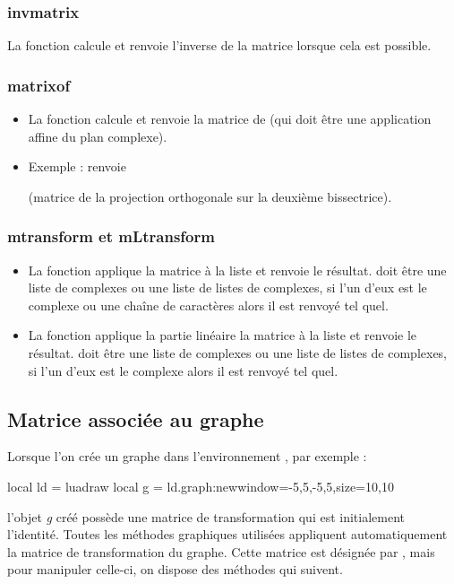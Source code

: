 \subsubsection{invmatrix}
La fonction  calcule et renvoie l'inverse de la matrice  lorsque cela est possible.

\subsubsection{matrixof}
\begin{itemize}
    \item La fonction  calcule et renvoie la matrice de  (qui doit être une application affine du plan complexe).
    \item Exemple :  renvoie \par
      (matrice de la projection orthogonale sur la deuxième bissectrice).
\end{itemize}

\subsubsection{mtransform et mLtransform}
\begin{itemize}
    \item La fonction  applique la matrice  à la liste  et renvoie le résultat.  doit être une liste de complexes ou une liste de listes de complexes, si l'un d'eux est le complexe  ou une chaîne de caractères alors il est renvoyé tel quel.
    
    \item La fonction  applique la partie linéaire la matrice  à la liste  et renvoie le résultat.  doit être une liste de complexes ou une liste de listes de complexes, si l'un d'eux est le complexe  alors il est renvoyé tel quel.
\end{itemize}

\subsection{Matrice associée au graphe}

Lorsque l'on crée un graphe dans l'environnement \luadrawenv, par exemple :
\begin{Luacode}
local ld = luadraw
local g = ld.graph:new{window={-5,5,-5,5},size={10,10}}
\end{Luacode}
l'objet \emph{g} créé possède une matrice de transformation qui est initialement l'identité. Toutes les méthodes graphiques utilisées appliquent automatiquement la matrice de transformation du graphe. Cette matrice est désignée par , mais pour manipuler celle-ci, on dispose des méthodes qui suivent.


